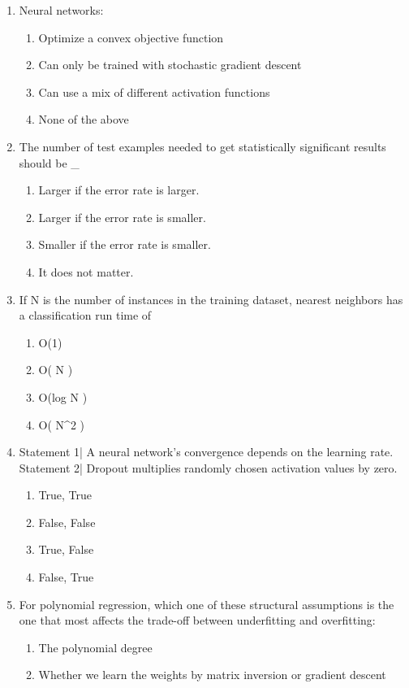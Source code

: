 \documentclass[12pt]{article}
\begin{document}
\begin{enumerate}[label=\arabic*.]
\item Neural networks:
\begin{enumerate}[label=(\alph*)]
    \item Optimize a convex objective function
    \item Can only be trained with stochastic gradient descent
    \item Can use a mix of different activation functions
    \item None of the above
\end{enumerate}
\item The number of test examples needed to get statistically significant results should be \_
\begin{enumerate}[label=(\alph*)]
    \item Larger if the error rate is larger.
    \item Larger if the error rate is smaller.
    \item Smaller if the error rate is smaller.
    \item It does not matter.
\end{enumerate}
\item If N is the number of instances in the training dataset, nearest neighbors has a classification run time of
\begin{enumerate}[label=(\alph*)]
    \item O(1)
    \item O( N )
    \item O(log N )
    \item O( N\^{}2 )
\end{enumerate}
\item Statement 1| A neural network's convergence depends on the learning rate. Statement 2| Dropout multiplies randomly chosen activation values by zero.
\begin{enumerate}[label=(\alph*)]
    \item True, True
    \item False, False
    \item True, False
    \item False, True
\end{enumerate}
\item For polynomial regression, which one of these structural assumptions is the one that most affects the trade-off between underfitting and overfitting:
\begin{enumerate}[label=(\alph*)]
    \item The polynomial degree
    \item Whether we learn the weights by matrix inversion or gradient descent

\end{enumerate}
\end{enumerate}
\end{document}
